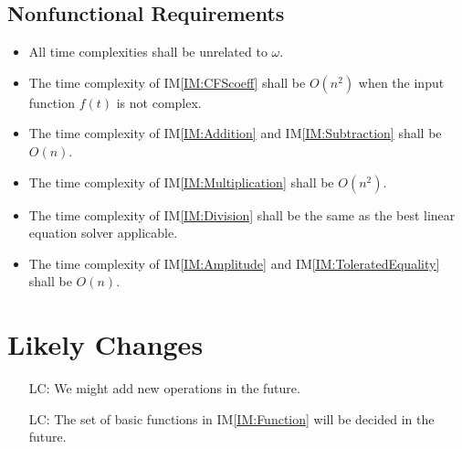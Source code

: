\documentclass[12pt]{article}
\newcommand{\iref}[1]{IM\ref{#1}}
\newcounter{lcnum} %
\begin{document}
\subsection{Nonfunctional Requirements}

\begin{itemize}
	\item All time complexities shall be unrelated to $\omega$.
	\item The time complexity of \iref{IM:CFScoeff} shall be $O(n^2)$ when the input function $f(t)$ is not complex.
	\item The time complexity of \iref{IM:Addition} and \iref{IM:Subtraction}  shall be $O(n)$.
	\item The time complexity of \iref{IM:Multiplication} shall be $O(n^2)$.
	\item The time complexity of \iref{IM:Division} shall be the same as the best linear equation solver applicable.
	\item The time complexity of \iref{IM:Amplitude} and \iref{IM:ToleratedEquality} shall be $O(n)$.
\end{itemize}

\section{Likely Changes}\label{Sc:LC}    
\noindent \begin{itemize}
\item[LC\refstepcounter{lcnum}\thelcnum\label{LC:NewOperation}:] We might add new operations in the future.
\item[LC\refstepcounter{lcnum}\thelcnum\label{LC:BasicFunction}:] The set of basic functions in \iref{IM:Function} will be decided in the future.
\end{itemize}
\end{document}
